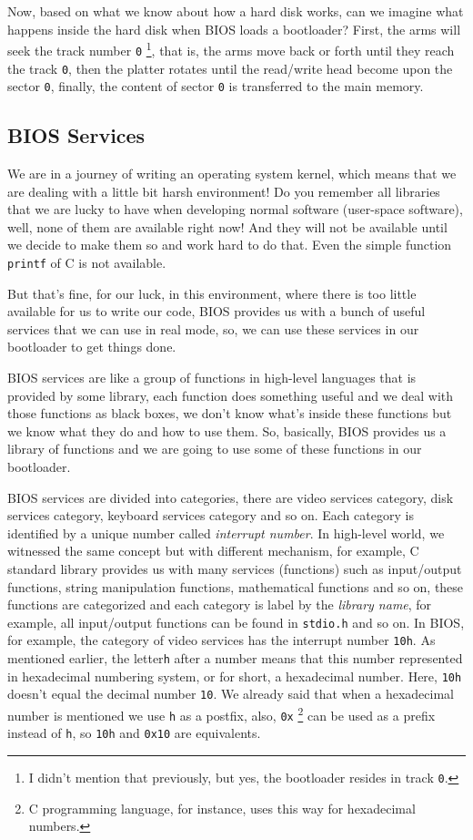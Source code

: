 Now, based on what we know about how a hard disk works, can we imagine
what happens inside the hard disk when BIOS loads a bootloader? First,
the arms will seek the track number \lstinline!0! \footnote{I didn't
  mention that previously, but yes, the bootloader resides in track
  \lstinline!0!.}, that is, the arms move back or forth until they reach
the track \lstinline!0!, then the platter rotates until the read/write
head become upon the sector \lstinline!0!, finally, the content of
sector \lstinline!0! is transferred to the main memory.

\subsection{BIOS Services}\label{bios-services}

We are in a journey of writing an operating system kernel, which means
that we are dealing with a little bit harsh environment! Do you remember
all libraries that we are lucky to have when developing normal software
(user-space software), well, none of them are available right now! And
they will not be available until we decide to make them so and work hard
to do that. Even the simple function \lstinline!printf! of C is not
available.

But that's fine, for our luck, in this environment, where there is too
little available for us to write our code, BIOS provides us with a bunch
of useful services that we can use in real mode, so, we can use these
services in our bootloader to get things done.

BIOS services are like a group of functions in high-level languages that
is provided by some library, each function does something useful and we
deal with those functions as black boxes, we don't know what's inside
these functions but we know what they do and how to use them. So,
basically, BIOS provides us a library of functions and we are going to
use some of these functions in our bootloader.

BIOS services are divided into categories, there are video services
category, disk services category, keyboard services category and so on.
Each category is identified by a unique number called \emph{interrupt
number}. In high-level world, we witnessed the same concept but with
different mechanism, for example, C standard library provides us with
many services (functions) such as input/output functions, string
manipulation functions, mathematical functions and so on, these
functions are categorized and each category is label by the
\emph{library name}, for example, all input/output functions can be
found in \lstinline!stdio.h! and so on. In BIOS, for example, the
category of video services has the interrupt number \lstinline!10h!. As
mentioned earlier, the letter\lstinline!h! after a number means that
this number represented in hexadecimal numbering system, or for short, a
hexadecimal number. Here, \lstinline!10h! doesn't equal the decimal
number \lstinline!10!. We already said that when a hexadecimal number is
mentioned we use \lstinline!h! as a postfix, also, \lstinline!0x!
\footnote{C programming language, for instance, uses this way for
  hexadecimal numbers.} can be used as a prefix instead of
\lstinline!h!, so \lstinline!10h! and \lstinline!0x10! are equivalents.

